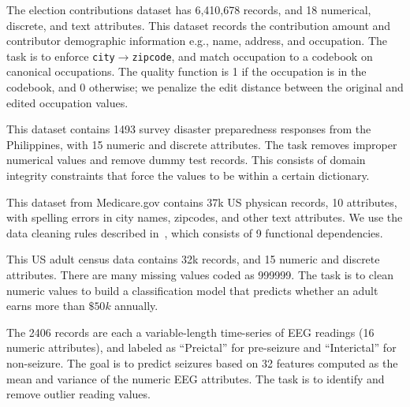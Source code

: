 
 The election contributions dataset has 6,410,678 records, and 18 numerical, discrete, and text attributes. This dataset records the contribution amount and contributor demographic information e.g., name, address, and occupation.  The task is to enforce \texttt{city$\rightarrow$zipcode}, and match occupation to a codebook on canonical occupations.  The quality function is 1 if the occupation is in the codebook, and 0 otherwise; we penalize the edit distance between the original and edited occupation values.



 This dataset contains 1493 survey disaster preparedness responses from the Philippines, with 15 numeric and discrete attributes. The task removes improper numerical values and remove dummy test records. This consists of domain integrity constraints that force the values to be within a certain dictionary.

 This dataset from Medicare.gov contains 37k US physican records, 10 attributes, with spelling errors in city names, zipcodes, and other text attributes. We use the data cleaning rules described in~\cite{rekatsinas2017holoclean}, which consists of 9 functional dependencies. 

 This US adult census data contains 32k records, and 15 numeric and discrete attributes.  There are many missing values coded as 999999.  The task is to clean numeric values to build a classification model that predicts whether an adult earns more than $\$50k$ annually. 

  The 2406 records are each a variable-length time-series of EEG readings (16 numeric attributes), and labeled as ``Preictal'' for pre-seizure and ``Interictal'' for non-seizure.  The goal is to predict seizures based on 32 features computed as the mean and variance of the numeric EEG attributes.  The task is to identify and remove outlier reading values.  

